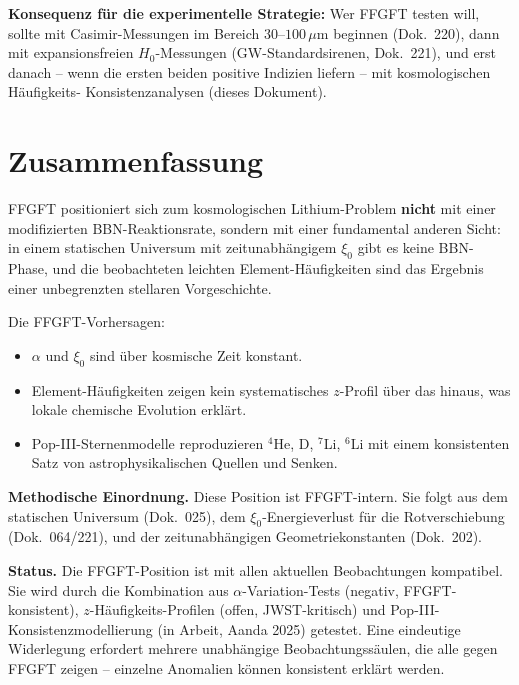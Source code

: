 \textbf{Konsequenz für die experimentelle Strategie:} Wer FFGFT
testen will, sollte mit Casimir-Messungen im Bereich $30$--$100\,\mu$m
beginnen (Dok.~220), dann mit expansionsfreien $H_0$-Messungen
(GW-Standardsirenen, Dok.~221), und erst danach -- wenn die ersten
beiden positive Indizien liefern -- mit kosmologischen Häufigkeits-
Konsistenzanalysen (dieses Dokument).

\section{Zusammenfassung}

FFGFT positioniert sich zum kosmologischen Lithium-Problem
\textbf{nicht} mit einer modifizierten BBN-Reaktionsrate, sondern
mit einer fundamental anderen Sicht: in einem statischen Universum
mit zeitunabhängigem $\xi_0$ gibt es keine BBN-Phase, und die
beobachteten leichten Element-Häufigkeiten sind das Ergebnis einer
unbegrenzten stellaren Vorgeschichte.

Die FFGFT-Vorhersagen:
\begin{itemize}[leftmargin=2em,itemsep=2pt,topsep=2pt]
  \item $\alpha$ und $\xi_0$ sind über kosmische Zeit konstant.
  \item Element-Häufigkeiten zeigen kein systematisches
        $z$-Profil über das hinaus, was lokale chemische Evolution
        erklärt.
  \item Pop-III-Sternenmodelle reproduzieren $^4$He, D, $^7$Li,
        $^6$Li mit einem konsistenten Satz von astrophysikalischen
        Quellen und Senken.
\end{itemize}

\textbf{Methodische Einordnung.} Diese Position ist FFGFT-intern.
Sie folgt aus dem statischen Universum (Dok.~025), dem
$\xi_0$-Energieverlust für die Rotverschiebung (Dok.~064/221), und
der zeitunabhängigen Geometriekonstanten (Dok.~202).

\textbf{Status.} Die FFGFT-Position ist mit allen aktuellen
Beobachtungen kompatibel. Sie wird durch die Kombination aus
$\alpha$-Variation-Tests (negativ, FFGFT-konsistent),
$z$-Häufigkeits-Profilen (offen, JWST-kritisch) und
Pop-III-Konsistenzmodellierung (in Arbeit, Aanda 2025) getestet.
Eine eindeutige Widerlegung erfordert mehrere unabhängige
Beobachtungssäulen, die alle gegen FFGFT zeigen --
einzelne Anomalien können konsistent erklärt werden.
